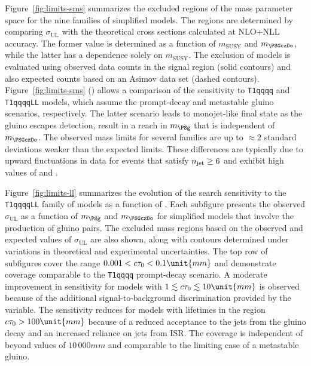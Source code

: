 Figure~\ref{fig:limits-sms} summarizes the excluded regions of the
mass parameter space for the nine families of simplified models. The
regions are determined by comparing $\sigma_\text{UL}$
with the theoretical cross sections calculated at NLO+NLL accuracy. 
The former value is determined as a function of $m_{\text{SUSY}}$ and
$m_{\PSGczDo}$, while the latter has a dependence solely on
$m_{\text{SUSY}}$. The exclusion of models is evaluated using observed
data counts in the signal region (solid contours) and also expected
counts based on an Asimov data set (dashed
contours). Figure~\ref{fig:limits-sms} (\cmsRight) allows a comparison
of the sensitivity to \texttt{T1qqqq} and \texttt{T1qqqqLL} models,
which assume the prompt-decay and metastable gluino scenarios,
respectively. The latter scenario leads to monojet-like final state as
the gluino escapes detection, result in a reach in $m_\PSg$ that is
independent of $m_{\PSGczDo}$. The observed mass limits for several
families are up to ${\approx}2$ standard deviations weaker than the
expected limits. These differences are typically due to upward
fluctuations in data for events that satisfy $n_{\text{jet}} \geq 6$ and
exhibit high values of \scalht and \mht. 

Figure~\ref{fig:limits-ll} summarizes the evolution of the search
sensitivity to the \texttt{T1qqqqLL} family of models as a function of
\ctau. Each subfigure presents the observed $\sigma_\text{UL}$ as a
function of $m_{\PSg}$ and $m_{\PSGczDo}$ for simplified models that
involve the production of gluino pairs. The excluded mass regions
based on the observed and expected values of $\sigma_\text{UL}$ are
also shown, along with contours determined under variations in
theoretical and experimental uncertainties. The top row of subfigures
cover the range $0.001 < \ctau < 0.1\unit{mm}$ and demonstrate
coverage comparable to the \texttt{T1qqqq} prompt-decay scenario. A
moderate improvement in sensitivity for models with $1 \lesssim \ctau
\lesssim 10\unit{mm}$ is observed because of the additional
signal-to-background discrimination provided by the \nb variable. The
sensitivity reduces for models with lifetimes in the region $\ctau >
100\unit{mm}$ because of a reduced acceptance to the jets from the
gluino decay and an increased reliance on jets from ISR. The coverage
is independent of \ctau beyond values of $10\,000\unit{mm}$ and
comparable to the limiting case of a metastable gluino. 

